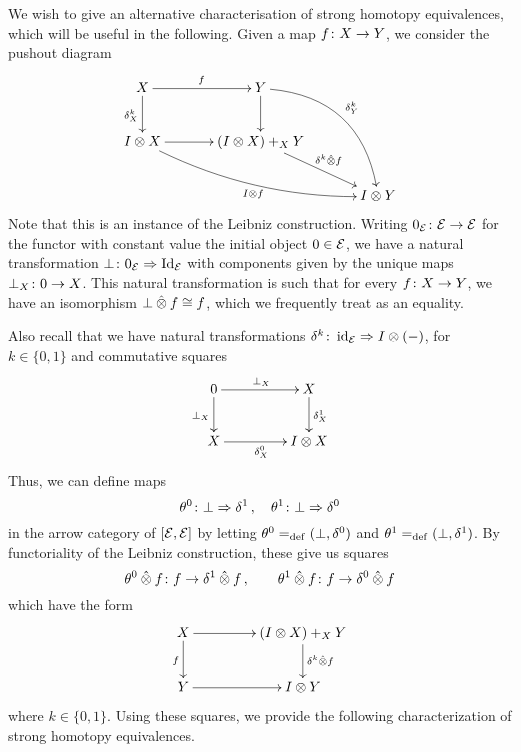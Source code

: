 \documentclass[reqno,10pt,a4paper,oneside]{amsart}
\begin{document}
We wish to give an alternative characterisation of strong homotopy equivalences, which will be useful in  the following. Given
a map $f \colon X \to Y$, we consider  the pushout diagram
 \begin{equation}
 \label{equ:delta-and-f}
 \begin{gathered}
\xymatrix@C=1.2cm{
X  \ar[r]^{f}  \ar[d]_{\kcyl_{X}} & Y  \ar@/^2pc/[ddr]^{\kcyl_{Y}} \ar[d] & \\ 
\interval \otimes X \ar@/_1pc/[drr]_{\interval \otimes f} \ar[r] & (\interval \otimes X) +_{X} Y \ar[dr]^-{\delta^k \hatotimes f}  & \\ 
 & & \interval \otimes Y} 
 \end{gathered}
 \end{equation}
Note that this is an instance of the Leibniz construction. 
Writing $0_{\mathcal{E}} \colon \mathcal{E} \to \mathcal{E}$ for the functor with constant value the initial object $0 \in \mathcal{E}$, we have a natural transformation 
$\bot \colon 0_{\mathcal{E}} \Rightarrow \operatorname{Id}_{\mathcal{E}}$ with components given by  the unique maps $\bot_X \colon 0 \to X$. This natural transformation is such that for every $f \colon X \to Y$, we have an isomorphism $\bot \mathbin{\hat{\otimes}} f \cong f$, which we frequently treat as an equality. 

Also recall that we have
natural transformations $\delta^k \colon \operatorname{id}_{\mathcal{E}} \Rightarrow I \otimes (-)$, for $k \in \{ 0, 1 \}$ and commutative squares
\begin{equation}
\label{trivial-square}
\begin{gathered}
\xymatrix@C+2em{
0 \ar[r]^{\bot_X} \ar[d]_{\bot_X} & X \ar[d]^{\rcyl_X} \\
X \ar[r]_{\lcyl_X} & \interval \otimes X}
\end{gathered}
\end{equation}
Thus, we can define maps \begin{equation}
\label{equ:thetas}
\theta^{0} \colon \bot \Rightarrow \delta^1 \, , \quad \theta^{1} \colon \bot \Rightarrow \delta^0 
\end{equation}
in the arrow category of $[\mathcal{E}, \mathcal{E}]$
 by letting $\theta^{0} =_{\operatorname{def}} (\bot, \delta^0)$ and $\theta^{1}  =_{\operatorname{def}} (\bot, \delta^1)$.  By functoriality of the Leibniz construction, these give us squares
 \[
 \theta^{0} \mathbin{\hat{\otimes}} f \colon f \to \delta^1 \mathbin{\hat{\otimes}} f  \, , \qquad \theta^{1} \mathbin{\hat{\otimes}} f \colon f \to \delta^0 \mathbin{\hat{\otimes}} f 
 \]
 which have the form
 \[
 \xymatrix@C+2em{
 X \ar[r] \ar[d]_{f}  & (\interval \otimes X) +_{X} Y  \ar[d]^{\kcyl \hatotimes f}  \\ 
 Y \ar[r] & \interval \otimes Y} 
 \]
 where $k \in \{0, 1\}$. Using these squares, we provide the following  characterization of strong homotopy equivalences.
\end{document}
